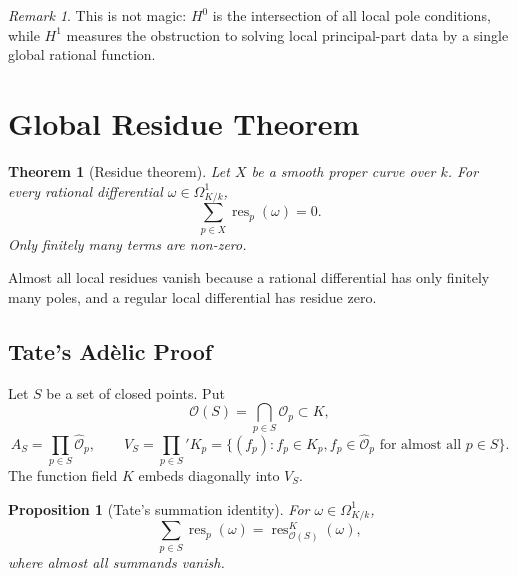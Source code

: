 \documentclass[11pt,a4paper]{article}
\newcommand{\OO}{\mathcal O}
\newcommand{\wideO}{\widehat{\mathcal O}}
\newcommand{\OmegaK}{\Omega^1_{K/k}}
\newcommand{\res}{\operatorname{res}}
\theoremstyle{definition}
\theoremstyle{plain}
\newtheorem{theorem}[definition]{Theorem}
\newtheorem{proposition}[definition]{Proposition}
\theoremstyle{remark}
\newtheorem*{remark}{Remark}
\begin{document}
\begin{remark}
This is not magic: $H^0$ is the intersection of all local pole conditions, while $H^1$ measures the obstruction to solving local principal-part data by a single global rational function.
\end{remark}

\section{Global Residue Theorem}

\begin{theorem}[Residue theorem]
Let $X$ be a smooth proper curve over $k$.  For every rational differential $\omega\in\OmegaK$,
\[
  \sum_{p\in X}\res_p(\omega)=0.
\]
Only finitely many terms are non-zero.
\end{theorem}

Almost all local residues vanish because a rational differential has only finitely many poles, and a regular local differential has residue zero.

\subsection{Tate's Adèlic Proof}

Let $S$ be a set of closed points.  Put
\[
  \OO(S)=\bigcap_{p\in S}\OO_p\subset K,
\]
\[
  A_S=\prod_{p\in S}\wideO_p,
  \qquad
  V_S=\prod_{p\in S}'K_p
  =\{(f_p) : f_p\in K_p,
       f_p\in\wideO_p\text{ for almost all }p\in S\}.
\]
The function field $K$ embeds diagonally into $V_S$.

\begin{proposition}[Tate's summation identity]
For $\omega\in\OmegaK$,
\[
  \sum_{p\in S}\res_p(\omega)=\res_{\OO(S)}^K(\omega),
\]
where almost all summands vanish.
\end{proposition}
\end{document}
